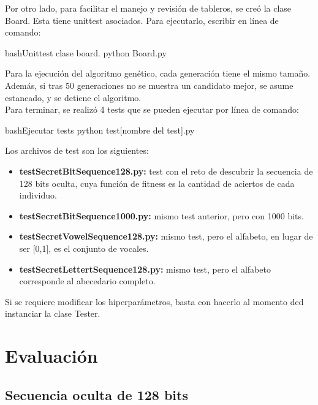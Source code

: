 \documentclass[letterpaper,11pt]{article} %
\begin{document}
Por otro lado, para facilitar el manejo y revisión de tableros, se creó la clase Board. Esta tiene unittest asociados. Para ejecutarlo, escribir en línea de comando:

\begin{sourcecode}[\label{unittestboard}]{bash}{Unittest clase board.}
python Board.py
\end{sourcecode}

Para la ejecución del algoritmo genético, cada generación tiene el mismo tamaño. Además, si tras 50 generaciones no se muestra un candidato mejor, se asume estancado, y se detiene el algoritmo.\\

Para terminar, se realizó 4 tests que se pueden ejecutar por línea de comando:

\begin{sourcecode}[\label{exectest}]{bash}{Ejecutar tests}
python test[nombre del test].py
\end{sourcecode}

Los archivos de test son los siguientes:

\begin{itemize}
\item \textbf{testSecretBitSequence128.py:} test con el reto de descubrir la secuencia de 128 bits oculta, cuya función de fitness es la cantidad de aciertos de cada individuo.
\item \textbf{testSecretBitSequence1000.py:} mismo test anterior, pero con 1000 bits.
\item \textbf{testSecretVowelSequence128.py:} mismo test, pero el alfabeto, en lugar de ser [0,1], es el conjunto de vocales.
\item \textbf{testSecretLettertSequence128.py:} mismo test, pero el alfabeto corresponde al abecedario completo.

\end{itemize}

Si se requiere modificar los hiperparámetros, basta con hacerlo al momento ded instanciar la clase Tester.

\section{Evaluación}

\subsection{Secuencia oculta de 128 bits}
\end{document}
